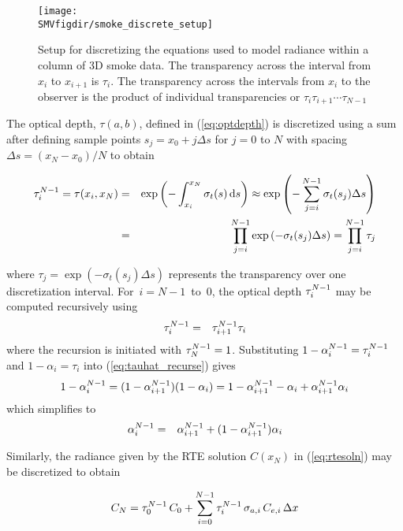 \documentclass[11pt]{article}
\newcommand{\SMVfigdir}{../../../fig/smv/figures}
\begin{document}
\begin{figure}[bph]
\begin{center}
\texttt{[image: \\SMVfigdir/smoke\_discrete\_setup]}
\end{center}
\caption{Setup for discretizing
the equations used to model radiance within a column of 3D smoke
data. The transparency across the interval from $x_i$ to $x_{i+1}$
is $\tau_i$. The transparency across the intervals from $x_i$ to
the observer is the product of individual transparencies or
$\tau_i\tau_{i+1}\cdots\tau_{N-1}$} \label{fig:smokediscretesetup}
\end{figure}

The optical depth, $\tau(a,b)$, defined in (\ref{eq:optdepth}) is
discretized using a sum  after defining sample points
$s_j=x_0+j\Delta s$ for $j=0$ to $N$ with spacing $\Delta
s=(x_N-x_0)/N$ to obtain

\begin{eqnarray}
\tau_{i}^{N-1}=\tau(x_i,x_N)&=&\exp\left(-\int_{x_i}^{x_N}\sigma_t(s)\,\mbox{d}s\right)\approx\exp\left(-\sum_{j=i}^{N-1}\sigma_t(s_j)\Delta s\right)\\
&=&\prod_{j=i}^{N-1}\exp\left(-\sigma_t(s_j)\Delta s\right)=\prod_{j=i}^{N-1}\tau_j
\end{eqnarray}

\noindent where $\tau_j=\exp\left(-\sigma_t(s_j)\Delta s\right)$
represents the transparency over one discretization interval.
For~$i=N-1$~to~$0$, the optical depth $\tau_{i}^{N-1}$ may be computed
recursively using
\begin{eqnarray}
\label{eq:tauhat_recurse}
\tau_{i}^{N-1}&=&\tau_{i+1}^{N-1}\tau_i
\end{eqnarray}
\noindent where the recursion is initiated with $\tau_{N}^{N-1}=1$.
Substituting $1-\alpha_{i}^{N-1}=\tau_{i}^{N-1}$ and $1-\alpha_i=\tau_i$ into
(\ref{eq:tauhat_recurse}) gives
\begin{eqnarray}
1-\alpha_{i}^{N-1}=(1-\alpha_{i+1}^{N-1})(1-\alpha_i)=1-\alpha_{i+1}^{N-1} - \alpha_i + \alpha_{i+1}^{N-1}\alpha_i
\end{eqnarray}
which simplifies to
\begin{eqnarray}
\label{eq:alpha2}
\alpha_{i}^{N-1}&=&\alpha_{i+1}^{N-1} + (1-\alpha_{i+1}^{N-1})\alpha_i
\end{eqnarray}

Similarly, the radiance given by the RTE solution $C(x_N)$ in
(\ref{eq:rtesoln}) may be discretized to obtain

\begin{equation}
C_{N} = \tau_{0}^{N-1}\,C_0 +
\sum_{i=0}^{N-1}\tau_{i}^{N-1}\,\sigma_{a,i}\,C_{e,i}\,\Delta x
\label{eq:discrete_rte2}
\end{equation}
\end{document}
